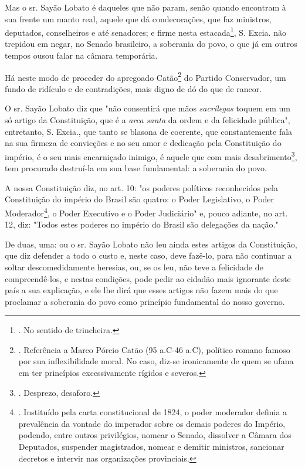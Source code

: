 Mas o sr. Sayão Lobato é daqueles que não param, senão quando encontram
à sua frente um manto real, aquele que dá condecorações, que faz
ministros, deputados, conselheiros e até senadores; e firme nesta
estacada\footnote{. No sentido de trincheira.}, S. Excia. não trepidou
em negar, no Senado brasileiro, a soberania do povo, o que já em outros
tempos ousou falar na câmara temporária.

Há neste modo de proceder do apregoado Catão\footnote{. Referência a
  Marco Pórcio Catão (95 a.C-46 a.C), político romano famoso por sua
  inflexibilidade moral. No caso, diz-se ironicamente de quem se ufana
  em ter princípios excessivamente rígidos e severos.} do Partido
Conservador, um fundo de ridículo e de contradições, mais digno de dó do
que de rancor.

O sr. Sayão Lobato diz que "não consentirá que mãos \emph{sacrílegas}
toquem em um só artigo da Constituição, que é a \emph{arca santa} da
ordem e da felicidade pública", entretanto, S. Excia., que tanto se
blasona de coerente, que constantemente fala na sua firmeza de
convicções e no seu amor e dedicação pela Constituição do império, é o
seu mais encarniçado inimigo, é aquele que com mais
desabrimento\footnote{. Desprezo, desaforo.}, tem procurado destruí-la
em sua base fundamental: a soberania do povo.

A nossa Constituição diz, no art. 10: "os poderes políticos reconhecidos
pela Constituição do império do Brasil são quatro: o Poder Legislativo,
o Poder Moderador\footnote{. Instituído pela carta constitucional de
  1824, o poder moderador definia a prevalência da vontade do imperador
  sobre os demais poderes do Império, podendo, entre outros privilégios,
  nomear o Senado, dissolver a Câmara dos Deputados, suspender
  magistrados, nomear e demitir ministros, sancionar decretos e intervir
  nas organizações provinciais.}, o Poder Executivo e o Poder
Judiciário" e, pouco adiante, no art. 12, diz: "Todos estes poderes no
império do Brasil são delegações da nação."

De duas, uma: ou o sr. Sayão Lobato não leu ainda estes artigos da
Constituição, que diz defender a todo o custo e, neste caso, deve
fazê-lo, para não continuar a soltar descomedidamente heresias, ou, se
os leu, não teve a felicidade de compreendê-los, e nestas condições,
pode pedir ao cidadão mais ignorante deste país a sua explicação, e ele
lhe dirá que esses artigos não fazem mais do que proclamar a soberania
do povo como princípio fundamental do nosso governo.

